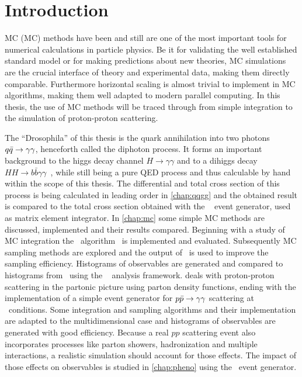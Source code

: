 \chapter{Introduction}%
\label{chap:intro}

MC (MC) methods have been and still are one of the most important
tools for numerical calculations in particle physics. Be it for
validating the well established standard model or for making
predictions about new theories, MC simulations are the
crucial interface of theory and experimental data, making them
directly comparable. Furthermore horizontal scaling is almost trivial
to implement in MC algorithms, making them well adapted to
modern parallel computing. In this thesis, the use of MC
methods will be traced through from simple integration to the
simulation of proton-proton scattering.

The ``Drosophila'' of this thesis is the quark annihilation into two
photons \(q\bar{q}\rightarrow\gamma\gamma\), henceforth called the diphoton process. It forms an
important background to the higgs decay channel
\(H\rightarrow \gamma\gamma\) and to a dihiggs decay
\(HH\rightarrow b\bar{b}\gamma\gamma\)~\cite{aaboud2018:sf}, while
still being a pure QED process and thus calculable by hand within the
scope of this thesis. The differential and total cross section of this
process is being calculated in leading order in \cref{chap:qqgg} and
the obtained result is compared to the total cross section obtained
with the \sherpa~\cite{Gleisberg:2008ta} event generator, used as
matrix element integrator. In \cref{chap:mc} some simple MC
methods are discussed, implemented and their results
compared. Beginning with a study of MC integration the
\vegas\ algorithm~\cite{Lepage:19781an} is implemented and
evaluated. Subsequently MC sampling methods are explored and
the output of \vegas\ is used to improve the sampling
efficiency. Histograms of observables are generated and compared to
histograms from \sherpa\ using the \rivet~\cite{Bierlich:2019rhm}
analysis framework.  deals with proton-proton
scattering in the partonic picture using parton density functions,
ending with the implementation of a simple event generator for
\(p\bar{p}\rightarrow\gamma\gamma\) scattering at \lhc\ conditions. Some integration and
sampling algorithms and their implementation are adapted to the
multidimensional case and histograms of observables are generated with
good efficiency.  Because a real \(pp\) scattering event also
incorporates processes like parton showers, hadronization and multiple
interactions, a realistic simulation should account for those
effects. The impact of those effects on observables is studied in
\cref{chap:pheno} using the \sherpa\ event generator.

